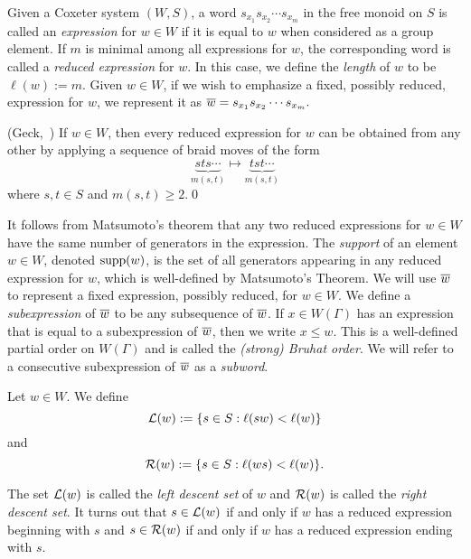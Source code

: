 Given a Coxeter system $(W,S)$, a word $s_{x_1}s_{x_2}\cdots s_{x_m}$ in the free monoid on $S$ is called an \emph
{expression} for $w\in W$ if it is equal to $w$ when considered as a group element. If $m$ is minimal among all expressions for $w$, the corresponding word is called a \emph{reduced expression} for $w$. In this case, we define the \emph{length} of $w$ to be $\ell(w):=m$. Given $w \in W$, if we wish to emphasize a fixed, possibly reduced, expression for $w$, we represent it as $\overline{w}=s_{x_1}s_{x_2}\cdots s_{x_m}.$
\begin{theorem}
{\rm (Geck,~\cite[Matsumoto's Theorem]{Geck2000})} If $w \in W$, then every reduced expression for $w$ can be obtained from any other by applying a sequence of braid moves of the form 
\[
{\underbrace{sts \cdots }_{m(s,t)} } \mapsto {\underbrace{tst \cdots}_{m(s,t)}}
\]
where $s,t \in S$ and $m(s,t)\ge 2$.\qed 
\end{theorem}
It follows from Matsumoto's theorem that any two reduced expressions for $w \in W$ have the same number of generators in the expression. The \emph{support} of an element $w \in W$, denoted $\mathrm{supp}(w)$, is the set of all generators appearing in any reduced expression for $w$, which is well-defined by Matsumoto's Theorem. We will use $\overline{w}$ to represent a fixed expression, possibly reduced, for $w \in W$. We define a \emph{subexpression} of $\overline{w}$ to be any subsequence of $\overline{w}$.  If $x \in W(\Gamma)$ has an expression that is equal to a subexpression of $\overline{w}$, then we write $x \leq w$.  This is a well-defined partial order \cite[Chapter 5]{Humphreys.J:A} on $W(\Gamma)$ and is called the \emph{(strong) Bruhat order}. We will refer to a consecutive subexpression of $\overline{w}$ as a \emph{subword}. 

Let $w \in W$.  We define
\[
\mathcal{L}(w):=\{s \in S: \ell(sw) < \ell(w)\}
\]
and
\[
\mathcal{R}(w):=\{s\in S:\ell(ws)<\ell(w)\}.
\]

\noindent The set $\mathcal{L}(w)$ is called the \emph{left descent set} of $w$ and $\mathcal{R}(w)$ is called the \emph{right descent set}. It turns out that $s \in \mathcal{L}(w)$ if and only if $w$ has a reduced expression beginning with $s$ and $s \in \mathcal{R}(w)$ if and only if $w$ has a reduced expression ending with $s$.

